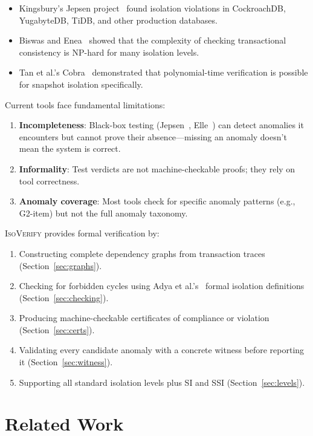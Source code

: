 \documentclass[11pt]{article}
\begin{document}
\begin{itemize}[leftmargin=*]
\item Kingsbury's Jepsen project~\cite{jepsen} found isolation violations in
  CockroachDB, YugabyteDB, TiDB, and other production databases.
\item Biswas and Enea~\cite{biswas2019} showed that the complexity of checking
  transactional consistency is NP-hard for many isolation levels.
\item Tan et al.'s Cobra~\cite{cobra} demonstrated that polynomial-time
  verification is possible for snapshot isolation specifically.
\end{itemize}

Current tools face fundamental limitations:
\begin{enumerate}[leftmargin=*]
\item \textbf{Incompleteness}: Black-box testing (Jepsen~\cite{jepsen},
  Elle~\cite{elle}) can detect anomalies it encounters but cannot prove their
  absence---missing an anomaly doesn't mean the system is correct.
\item \textbf{Informality}: Test verdicts are not machine-checkable proofs;
  they rely on tool correctness.
\item \textbf{Anomaly coverage}: Most tools check for specific anomaly
  patterns (e.g., G2-item) but not the full anomaly taxonomy.
\end{enumerate}

\textsc{IsoVerify} provides formal verification by:
\begin{enumerate}
\item Constructing complete dependency graphs from transaction traces
  (Section~\ref{sec:graphs}).
\item Checking for forbidden cycles using Adya et al.'s~\cite{adya1999}
  formal isolation definitions (Section~\ref{sec:checking}).
\item Producing machine-checkable certificates of compliance or violation
  (Section~\ref{sec:certs}).
\item Validating every candidate anomaly with a concrete witness before
  reporting it (Section~\ref{sec:witness}).
\item Supporting all standard isolation levels plus SI and SSI
  (Section~\ref{sec:levels}).
\end{enumerate}

\section{Related Work}
\label{sec:related}
\end{document}
